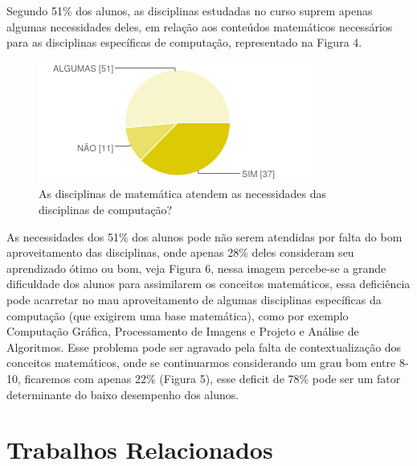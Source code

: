 \documentclass[12pt,a4paper]{article}
\begin{document}
Segundo 51\% dos alunos, as disciplinas estudadas no curso suprem apenas algumas necessidades deles, em relação aos conteúdos matemáticos necessários para as disciplinas específicas de computação, representado na Figura 4. 

\begin{figure}[!h]
\centering
\includegraphics[scale=0.7]{imagens/fig4.png} 
\caption{As disciplinas de matemática atendem as necessidades das disciplinas de computação?}
\end{figure}

As necessidades dos 51\% dos alunos pode não serem atendidas por falta do bom aproveitamento das disciplinas, onde apenas 28\% deles consideram seu aprendizado ótimo ou bom, veja Figura 6, nessa imagem percebe-se a grande dificuldade dos alunos para assimilarem os conceitos matemáticos, essa deficiência pode acarretar no mau aproveitamento de algumas disciplinas específicas da computação (que exigirem uma base matemática), como por exemplo Computação Gráfica, Processamento de Imagens e Projeto e Análise de Algoritmos. Esse problema pode ser agravado pela falta de contextualização dos conceitos matemáticos, onde se continuarmos considerando um grau bom entre 8-10, ficaremos com apenas 22\% (Figura 5), esse deficit de 78\% pode ser um fator determinante do baixo desempenho dos alunos. 


\section{Trabalhos Relacionados}
\end{document}
